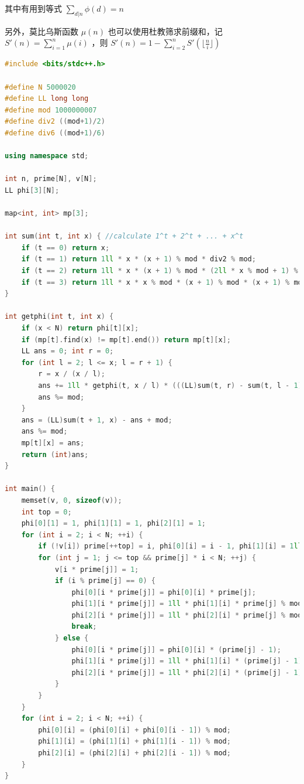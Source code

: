 \documentclass{article}
\begin{document}
其中有用到等式 $\sum\limits_{d | n} \phi(d) = n$

另外，莫比乌斯函数 $\mu(n)$ 也可以使用杜教筛求前缀和，记 $S'(n) = \sum\limits_{i = 1}^{n} \mu (i)$ ，则 $S'(n) = 1 - \sum\limits_{i = 2}^{n} S'(\lfloor \frac{n}{i} \rfloor)$


\begin{lstlisting}[language=C++]
#include <bits/stdc++.h>
 
#define N 5000020
#define LL long long
#define mod 1000000007
#define div2 ((mod+1)/2)
#define div6 ((mod+1)/6)
 
using namespace std;
 
int n, prime[N], v[N];
LL phi[3][N];
 
map<int, int> mp[3];
 
int sum(int t, int x) { //calculate 1^t + 2^t + ... + x^t
	if (t == 0) return x;
	if (t == 1) return 1ll * x * (x + 1) % mod * div2 % mod;
	if (t == 2) return 1ll * x * (x + 1) % mod * (2ll * x % mod + 1) % mod * div6 % mod;
	if (t == 3) return 1ll * x * x % mod * (x + 1) % mod * (x + 1) % mod * div2 % mod * div2 % mod;
}
 
int getphi(int t, int x) {
	if (x < N) return phi[t][x];
	if (mp[t].find(x) != mp[t].end()) return mp[t][x];
	LL ans = 0; int r = 0;
	for (int l = 2; l <= x; l = r + 1) {
		r = x / (x / l);
		ans += 1ll * getphi(t, x / l) * (((LL)sum(t, r) - sum(t, l - 1) + mod) % mod) % mod;
		ans %= mod;
	}
	ans = (LL)sum(t + 1, x) - ans + mod;
	ans %= mod;
	mp[t][x] = ans;
	return (int)ans;
}
 
int main() {
	memset(v, 0, sizeof(v));
	int top = 0;
	phi[0][1] = 1, phi[1][1] = 1, phi[2][1] = 1;
	for (int i = 2; i < N; ++i) {
		if (!v[i]) prime[++top] = i, phi[0][i] = i - 1, phi[1][i] = 1ll * i * phi[0][i] % mod, phi[2][i] = 1ll * i * phi[1][i] % mod;
		for (int j = 1; j <= top && prime[j] * i < N; ++j) {
			v[i * prime[j]] = 1;
			if (i % prime[j] == 0) {
				phi[0][i * prime[j]] = phi[0][i] * prime[j];
				phi[1][i * prime[j]] = 1ll * phi[1][i] * prime[j] % mod * prime[j] % mod;
				phi[2][i * prime[j]] = 1ll * phi[2][i] * prime[j] % mod * prime[j] % mod * prime[j] % mod;
				break;
			} else {
				phi[0][i * prime[j]] = phi[0][i] * (prime[j] - 1);
				phi[1][i * prime[j]] = 1ll * phi[1][i] * (prime[j] - 1) % mod * prime[j] % mod;
				phi[2][i * prime[j]] = 1ll * phi[2][i] * (prime[j] - 1) % mod * prime[j] % mod * prime[j] % mod;
			}
		}
	}
	for (int i = 2; i < N; ++i) {
		phi[0][i] = (phi[0][i] + phi[0][i - 1]) % mod;
		phi[1][i] = (phi[1][i] + phi[1][i - 1]) % mod;
		phi[2][i] = (phi[2][i] + phi[2][i - 1]) % mod;
	}
}
\end{lstlisting}
\end{document}
